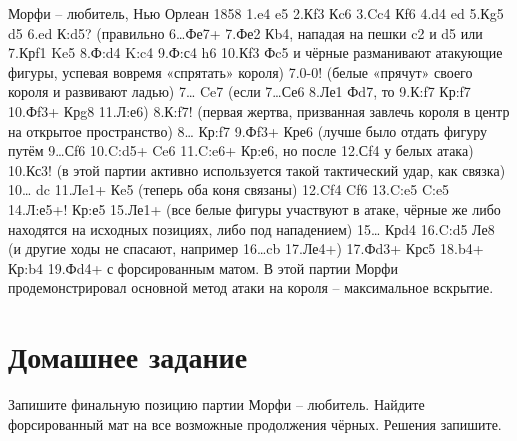 Морфи – любитель, Нью Орлеан 1858
1.e4 e5 2.Кf3 Кc6 3.Cc4 Кf6 4.d4 ed 5.Кg5 d5 6.ed К:d5? (правильно 6…Фе7+ 7.Фе2 Кb4, нападая на пешки c2 и d5 или 7.Крf1 Ke5 8.Ф:d4 K:c4 9.Ф:с4 h6 10.Кf3 Фc5 и чёрные разманивают атакующие фигуры, успевая вовремя «спрятать» короля) 7.0-0! (белые «прячут» своего короля и развивают ладью) 7… Ce7 (если 7…Се6 8.Ле1 Фd7, то 9.К:f7 Кр:f7 10.Фf3+ Крg8 11.Л:е6) 8.К:f7! (первая жертва, призванная завлечь короля в центр на открытое пространство) 8… Кр:f7 9.Фf3+ Кре6 (лучше было отдать фигуру путём 9…Сf6 10.C:d5+ Ce6 11.C:e6+ Кр:е6, но после 12.Сf4 у белых атака) 10.Кс3! (в этой партии активно используется такой тактический удар, как связка) 10… dc 11.Лe1+ Кe5 (теперь оба коня связаны) 12.Cf4 Cf6 13.C:e5 C:e5 14.Л:е5+! Кр:е5 15.Ле1+ (все белые фигуры участвуют в атаке, чёрные же либо находятся на исходных позициях, либо под нападением) 15… Крd4 16.C:d5 Ле8 (и другие ходы не спасают, например 16…cb 17.Ле4+) 17.Фd3+ Крс5 18.b4+ Кр:b4 19.Фd4+ с форсированным матом. В этой партии Морфи продемонстрировал основной метод атаки на короля – максимальное вскрытие.

\section{Домашнее задание}

Запишите финальную позицию партии Морфи – любитель. Найдите форсированный мат на все возможные продолжения чёрных. Решения запишите.